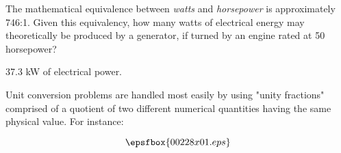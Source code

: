 

The mathematical equivalence between {\it watts} and {\it horsepower} is approximately 746:1.  Given this equivalency, how many watts of electrical energy may theoretically be produced by a generator, if turned by an engine rated at 50 horsepower?







37.3 kW of electrical power.







Unit conversion problems are handled most easily by using "unity fractions" comprised of a quotient of two different numerical quantities having the same physical value.  For instance:

$$\epsfbox{00228x01.eps}$$




